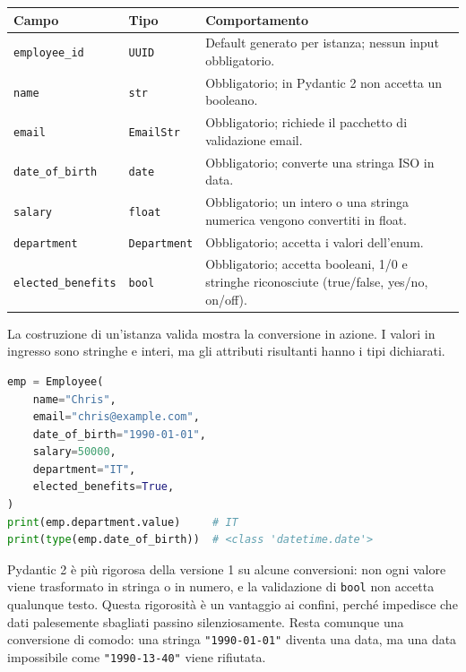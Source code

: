 \documentclass[12pt]{extarticle}
\begin{document}
\begin{center}
\small
\begin{tabular}{p{3.8cm}p{5.6cm}p{6.0cm}}
    \toprule
    \textbf{Campo} & \textbf{Tipo} & \textbf{Comportamento} \\
    \midrule
    \texttt{employee\_id} & \texttt{UUID} & Default generato per istanza; nessun input obbligatorio. \\
    \addlinespace
    \texttt{name} & \texttt{str} & Obbligatorio; in Pydantic 2 non accetta un booleano. \\
    \addlinespace
    \texttt{email} & \texttt{EmailStr} & Obbligatorio; richiede il pacchetto di validazione email. \\
    \addlinespace
    \texttt{date\_of\_birth} & \texttt{date} & Obbligatorio; converte una stringa ISO in data. \\
    \addlinespace
    \texttt{salary} & \texttt{float} & Obbligatorio; un intero o una stringa numerica vengono convertiti in float. \\
    \addlinespace
    \texttt{department} & \texttt{Department} & Obbligatorio; accetta i valori dell'enum. \\
    \addlinespace
    \texttt{elected\_benefits} & \texttt{bool} & Obbligatorio; accetta booleani, 1/0 e stringhe riconosciute (true/false, yes/no, on/off). \\
    \bottomrule
\end{tabular}
\end{center}

\noindent La costruzione di un'istanza valida mostra la conversione in azione. I valori in ingresso sono stringhe e interi, ma gli attributi risultanti hanno i tipi dichiarati.

\begin{lstlisting}[language=Python]
emp = Employee(
    name="Chris",
    email="chris@example.com",
    date_of_birth="1990-01-01",
    salary=50000,
    department="IT",
    elected_benefits=True,
)
print(emp.department.value)     # IT
print(type(emp.date_of_birth))  # <class 'datetime.date'>
\end{lstlisting}

\noindent Pydantic 2 è più rigorosa della versione 1 su alcune conversioni: non ogni valore viene trasformato in stringa o in numero, e la validazione di \texttt{bool} non accetta qualunque testo. Questa rigorosità è un vantaggio ai confini, perché impedisce che dati palesemente sbagliati passino silenziosamente. Resta comunque una conversione di comodo: una stringa \texttt{"1990-01-01"} diventa una data, ma una data impossibile come \texttt{"1990-13-40"} viene rifiutata.
\end{document}
